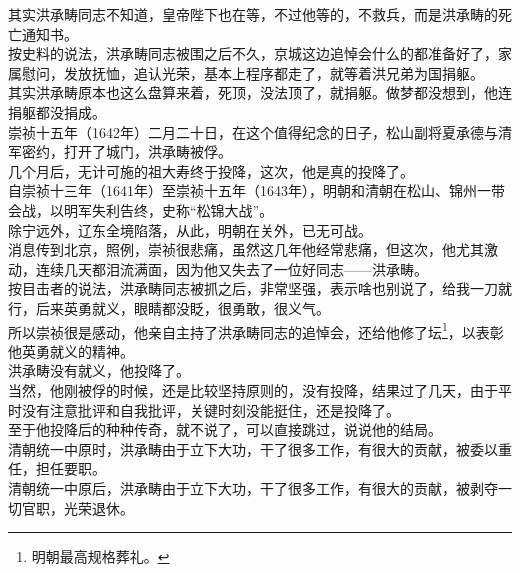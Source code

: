 \begin{multicols}{\theparacolNo}
其实洪承畴同志不知道，皇帝陛下也在等，不过他等的，不救兵，而是洪承畴的死亡通知书。\\

按史料的说法，洪承畴同志被围之后不久，京城这边追悼会什么的都准备好了，家属慰问，发放抚恤，追认光荣，基本上程序都走了，就等着洪兄弟为国捐躯。\\

其实洪承畴原本也这么盘算来着，死顶，没法顶了，就捐躯。做梦都没想到，他连捐躯都没捐成。\\

崇祯十五年（1642年）二月二十日，在这个值得纪念的日子，松山副将夏承德与清军密约，打开了城门，洪承畴被俘。\\

几个月后，无计可施的祖大寿终于投降，这次，他是真的投降了。\\

自崇祯十三年（1641年）至崇祯十五年（1643年），明朝和清朝在松山、锦州一带会战，以明军失利告终，史称“松锦大战”。\\

除宁远外，辽东全境陷落，从此，明朝在关外，已无可战。\\

消息传到北京，照例，崇祯很悲痛，虽然这几年他经常悲痛，但这次，他尤其激动，连续几天都泪流满面，因为他又失去了一位好同志——洪承畴。\\

按目击者的说法，洪承畴同志被抓之后，非常坚强，表示啥也别说了，给我一刀就行，后来英勇就义，眼睛都没眨，很勇敢，很义气。\\

所以崇祯很是感动，他亲自主持了洪承畴同志的追悼会，还给他修了坛\footnote{明朝最高规格葬礼。}，以表彰他英勇就义的精神。\\

洪承畴没有就义，他投降了。\\

当然，他刚被俘的时候，还是比较坚持原则的，没有投降，结果过了几天，由于平时没有注意批评和自我批评，关键时刻没能挺住，还是投降了。\\

至于他投降后的种种传奇，就不说了，可以直接跳过，说说他的结局。\\

清朝统一中原时，洪承畴由于立下大功，干了很多工作，有很大的贡献，被委以重任，担任要职。\\

清朝统一中原后，洪承畴由于立下大功，干了很多工作，有很大的贡献，被剥夺一切官职，光荣退休。\\


\end{multicols}
